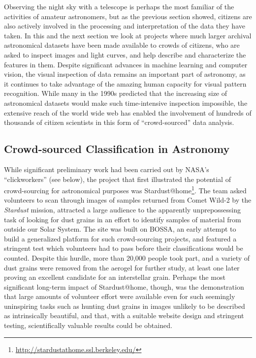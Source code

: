 \documentclass{ar2e}
\begin{document}
Observing the night sky with a telescope is perhaps the most familiar of the
activities of amateur astronomers, but as the previous section showed, citizens
are also actively involved in the processing and interpretation of the data they
have taken.  In this and the next section we look at projects where much larger
archival astronomical datasets have been made available to crowds of citizens,
who are asked to inspect images and light curves, and help describe and
characterize the features in them. Despite significant advances in machine
learning and computer vision, the visual inspection of data remains an important
part of astronomy, as it continues to take advantage of the amazing human
capacity for visual pattern recognition. While many in the 1990s predicted that
the increasing size of astronomical datasets would make such time-intensive
inspection impossible, the extensive reach of the world wide web has enabled the
involvement of hundreds of thousands of citizen scientists in this form of
``crowd-sourced'' data analysis. 


\subsection{Crowd-sourced Classification in Astronomy}
\label{sec:class:astro}

While significant preliminary work had been carried out by NASA's
``clickworkers'' (see below), the project that first illustrated the potential
of crowd-sourcing for astronomical purposes was 
Stardust@home\footnote{\url{http://stardustathome.ssl.berkeley.edu/}}. The team
asked volunteers to scan through images of samples returned from Comet Wild-2 by
the \emph{Stardust} mission, attracted a large audience to the apparently
unprepossessing task of looking for dust grains in an effort to identify samples
of material from outside our Solar System. The site was built on BOSSA, an early
attempt to build a generalized platform for such crowd-sourcing projects, and
featured a stringent test which volunteers had to pass before their
classifications would be counted. Despite this hurdle, more than 20,000 people
took part, and a variety of dust grains were removed from the aerogel for
further study, at least one later proving an excellent candidate for an
interstellar grain. Perhaps the most significant long-term impact of
Stardust@home, though, was the demonstration that large amounts of volunteer
effort were available even for such seemingly uninspiring tasks such as hunting
dust grains in images unlikely to be described as intrinsically beautiful, and
that, with a suitable website design and stringent testing, scientifically
valuable results could be obtained. 
\end{document}
